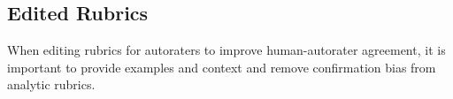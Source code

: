 \subsection{Edited Rubrics}

When editing rubrics for autoraters to improve human-autorater agreement, it is important to provide examples and context and remove confirmation bias from analytic rubrics.













